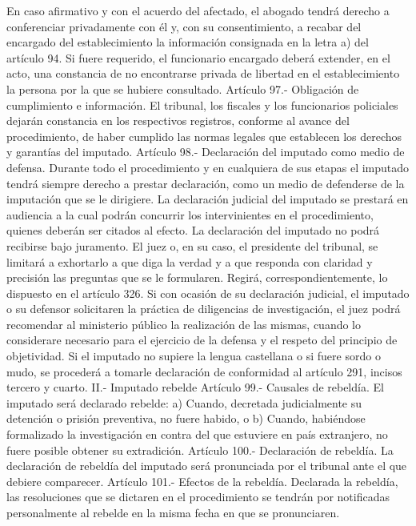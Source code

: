     En caso afirmativo y con el acuerdo del afectado, el abogado tendrá derecho a conferenciar privadamente con él y, con su consentimiento, a recabar del encargado del establecimiento la información consignada en la letra a) del artículo 94.
    Si fuere requerido, el funcionario encargado deberá extender, en el acto, una constancia de no encontrarse privada de libertad en el establecimiento la persona por la que se hubiere consultado.
    Artículo 97.- Obligación de cumplimiento e información. El tribunal, los fiscales y los funcionarios policiales dejarán constancia en los respectivos registros, conforme al avance del procedimiento, de haber cumplido las normas legales que establecen los derechos y garantías del imputado.
    Artículo 98.- Declaración del imputado como medio de defensa. Durante todo el procedimiento y en cualquiera de sus etapas el imputado tendrá siempre derecho a prestar declaración, como un medio de defenderse de la imputación que se le dirigiere.
    La declaración judicial del imputado se prestará en audiencia a la cual podrán concurrir los intervinientes en el procedimiento, quienes deberán ser citados al efecto.
    La declaración del imputado no podrá recibirse bajo juramento. El juez o, en su caso, el presidente del tribunal, se limitará a exhortarlo a que diga la verdad y a que responda con claridad y precisión las preguntas que se le formularen. Regirá, correspondientemente, lo dispuesto en el artículo 326.
    Si con ocasión de su declaración judicial, el imputado o su defensor solicitaren la práctica de diligencias de investigación, el juez podrá recomendar al ministerio público la realización de las mismas, cuando lo considerare necesario para el ejercicio de la defensa y el respeto del principio de objetividad.
    Si el imputado no supiere la lengua castellana o si fuere sordo o mudo, se procederá a tomarle declaración de conformidad al artículo 291, incisos tercero y cuarto.
    II.- Imputado rebelde
    Artículo 99.- Causales de rebeldía. El imputado será declarado rebelde:
    a) Cuando, decretada judicialmente su detención o prisión preventiva, no fuere habido, o
    b) Cuando, habiéndose formalizado la investigación en contra del que estuviere en país extranjero, no fuere posible obtener su extradición.
    Artículo 100.- Declaración de rebeldía. La declaración de rebeldía del imputado será pronunciada por el tribunal ante el que debiere comparecer.
    Artículo 101.- Efectos de la rebeldía. Declarada la rebeldía, las resoluciones que se dictaren en el procedimiento se tendrán por notificadas personalmente al rebelde en la misma fecha en que se pronunciaren.
